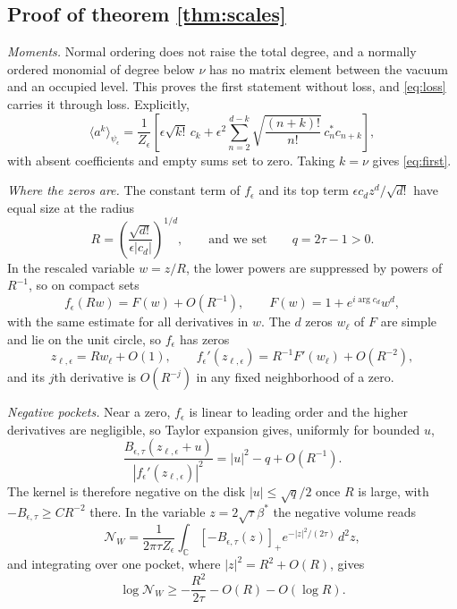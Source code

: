 \documentclass[11pt,a4paper]{article}
\newcommand{\ev}[1]{\langle#1\rangle}
\newcommand{\NW}{\mathcal N_W}
\begin{document}
\subsection{Proof of theorem \ref{thm:scales}}

\emph{Moments.} Normal ordering does not raise the total degree, and a normally ordered monomial of degree below $\nu$ has no matrix element between the vacuum and an occupied level. This proves the first statement without loss, and \eqref{eq:loss} carries it through loss. Explicitly,
\begin{equation}
 \ev{a^k}_{\psi_\epsilon}
 =\frac{1}{Z_\epsilon}\left[
 \epsilon\sqrt{k!}\,c_k+\epsilon^2
 \sum_{n=2}^{d-k}\sqrt{\frac{(n+k)!}{n!}}\,c_n^*c_{n+k}\right],
 \label{eq:moment}
\end{equation}
with absent coefficients and empty sums set to zero. Taking $k=\nu$ gives \eqref{eq:first}.

\emph{Where the zeros are.} The constant term of $f_\epsilon$ and its top term $\epsilon c_dz^d/\sqrt{d!}$ have equal size at the radius
\begin{equation}
 R=\left(\frac{\sqrt{d!}}{\epsilon|c_d|}\right)^{1/d},
 \qquad\text{and we set}\qquad q=2\tau-1>0.
 \label{eq:R}
\end{equation}
In the rescaled variable $w=z/R$, the lower powers are suppressed by powers of $R^{-1}$, so on compact sets
\begin{equation}
 f_\epsilon(Rw)=F(w)+O(R^{-1}),
 \qquad F(w)=1+e^{i\arg c_d}w^d,
 \label{eq:F}
\end{equation}
with the same estimate for all derivatives in $w$. The $d$ zeros $w_\ell$ of $F$ are simple and lie on the unit circle, so $f_\epsilon$ has zeros
\begin{equation}
 z_{\ell,\epsilon}=Rw_\ell+O(1),\qquad
 f_\epsilon'(z_{\ell,\epsilon})=R^{-1}F'(w_\ell)+O(R^{-2}),
 \label{eq:roots}
\end{equation}
and its $j$th derivative is $O(R^{-j})$ in any fixed neighborhood of a zero.

\emph{Negative pockets.} Near a zero, $f_\epsilon$ is linear to leading order and the higher derivatives are negligible, so Taylor expansion gives, uniformly for bounded $u$,
\begin{equation}
 \frac{B_{\epsilon,\tau}(z_{\ell,\epsilon}+u)}
 {|f_\epsilon'(z_{\ell,\epsilon})|^2}
 =|u|^2-q+O(R^{-1}).
 \label{eq:pocket}
\end{equation}
The kernel is therefore negative on the disk $|u|\le\sqrt q/2$ once $R$ is large, with $-B_{\epsilon,\tau}\ge CR^{-2}$ there. In the variable $z=2\sqrt\tau\beta^*$ the negative volume reads
\begin{equation}
 \NW=\frac{1}{2\pi\tau Z_\epsilon}
 \int_{\mathbb C}[-B_{\epsilon,\tau}(z)]_+
             e^{-|z|^2/(2\tau)}\,d^2z,
 \label{eq:integral}
\end{equation}
and integrating over one pocket, where $|z|^2=R^2+O(R)$, gives
\begin{equation}
 \log\NW\ge-\frac{R^2}{2\tau}-O(R)-O(\log R).
 \label{eq:lower}
\end{equation}
\end{document}

